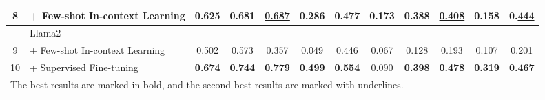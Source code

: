 \begin{table*}[t]
{\begin{tabular}{clcccccccccc}
\multicolumn{1}{c|}{8}                             & \multicolumn{1}{l|}{\quad + Few-shot In-context Learning} &\multicolumn{1}{c|}{0.625}                           & \multicolumn{1}{c|}{0.681}                            & \underline{0.687}          & \multicolumn{1}{c|}{0.286}           & 0.477              & \textbf{0.173}     & \multicolumn{1}{c|}{0.388}             & \underline{0.408}             & 0.158              & 0.\underline{444}               \\ \hline
\multicolumn{1}{l|}{}                              & \multicolumn{1}{l|}{Llama2~\cite{touvron2023llama}}                          & \multicolumn{1}{c|}{}                                & \multicolumn{1}{c|}{}                                 &                & \multicolumn{1}{c|}{}                &                    &                    & \multicolumn{1}{c|}{}                  &                   &                    &                     \\
\multicolumn{1}{c|}{9}                             & \multicolumn{1}{l|}{\quad + Few-shot In-context Learning}               & \multicolumn{1}{c|}{0.502}                           & \multicolumn{1}{c|}{0.573}                            & 0.357          & \multicolumn{1}{c|}{0.049}           & 0.446              & 0.067              & \multicolumn{1}{c|}{0.128}             & 0.193             & 0.107              & 0.201               \\
\multicolumn{1}{c|}{10}                            & \multicolumn{1}{l|}{\quad + Supervised Fine-tuning}                     & \multicolumn{1}{c|}{\textbf{0.674}}                  & \multicolumn{1}{c|}{\textbf{0.744}}                   & \textbf{0.779} & \multicolumn{1}{c|}{\textbf{0.499}}  & \textbf{0.554}     & \underline{0.090}              & \multicolumn{1}{c|}{\textbf{0.398}}    & \textbf{0.478}    & \textbf{0.319}     & \textbf{0.467}      \\ \hline
\multicolumn{12}{l}{\small * The best results are marked in bold, and the second-best results are marked with underlines.}                                                                                                                                                                                                                                                                                                                 
\end{tabular}
}
\vspace{5pt}
\end{table*}

